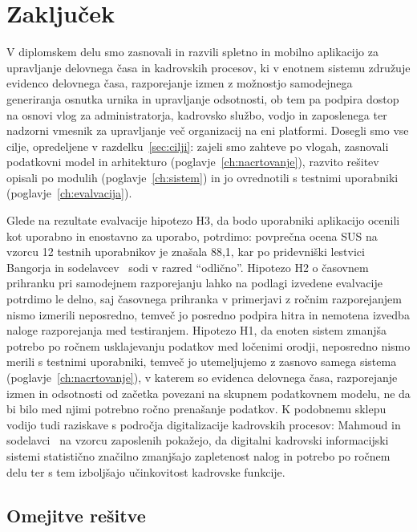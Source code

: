 \chapter{Zaključek}
\label{ch:zakljucek}

V diplomskem delu smo zasnovali in razvili spletno in mobilno aplikacijo za upravljanje delovnega časa in kadrovskih procesov, ki v enotnem sistemu združuje evidenco delovnega časa, razporejanje izmen z možnostjo samodejnega generiranja osnutka urnika in upravljanje odsotnosti, ob tem pa podpira dostop na osnovi vlog za administratorja, kadrovsko službo, vodjo in zaposlenega ter nadzorni vmesnik za upravljanje več organizacij na eni platformi. Dosegli smo vse cilje, opredeljene v razdelku~\ref{sec:cilji}: zajeli smo zahteve po vlogah, zasnovali podatkovni model in arhitekturo (poglavje~\ref{ch:nacrtovanje}), razvito rešitev opisali po modulih (poglavje~\ref{ch:sistem}) in jo ovrednotili s testnimi uporabniki (poglavje~\ref{ch:evalvacija}).

Glede na rezultate evalvacije hipotezo H3, da bodo uporabniki aplikacijo ocenili kot uporabno in enostavno za uporabo, potrdimo: povprečna ocena SUS na vzorcu 12 testnih uporabnikov je znašala 88,1, kar po pridevniški lestvici Bangorja in sodelavcev~\cite{bangor2009determining} sodi v razred ``odlično''. Hipotezo H2 o časovnem prihranku pri samodejnem razporejanju lahko na podlagi izvedene evalvacije potrdimo le delno, saj časovnega prihranka v primerjavi z ročnim razporejanjem nismo izmerili neposredno, temveč jo posredno podpira hitra in nemotena izvedba naloge razporejanja med testiranjem. Hipotezo H1, da enoten sistem zmanjša potrebo po ročnem usklajevanju podatkov med ločenimi orodji, neposredno nismo merili s testnimi uporabniki, temveč jo utemeljujemo z zasnovo samega sistema (poglavje~\ref{ch:nacrtovanje}), v katerem so evidenca delovnega časa, razporejanje izmen in odsotnosti od začetka povezani na skupnem podatkovnem modelu, ne da bi bilo med njimi potrebno ročno prenašanje podatkov. K podobnemu sklepu vodijo tudi raziskave s področja digitalizacije kadrovskih procesov: Mahmoud in sodelavci~\cite{mahmoud2025digitalhrm} na vzorcu zaposlenih pokažejo, da digitalni kadrovski informacijski sistemi statistično značilno zmanjšajo zapletenost nalog in potrebo po ročnem delu ter s tem izboljšajo učinkovitost kadrovske funkcije.

\section{Omejitve rešitve}

